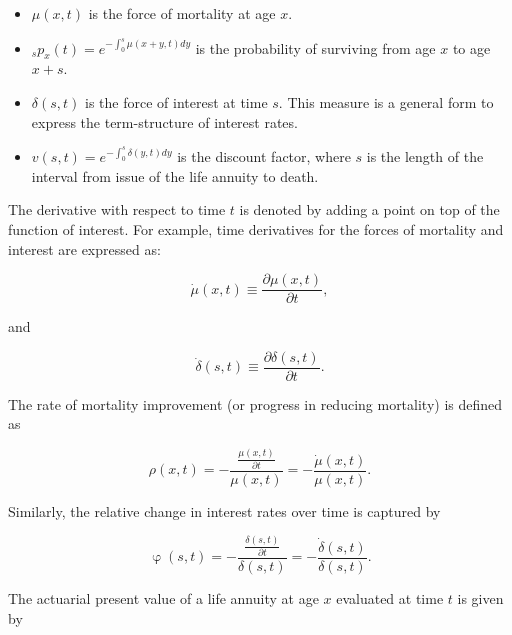 \documentclass[12pt]{article}
\begin{document}
\begin{itemize}

\item
\(\mu(x,t)\) is the force of mortality at age \(x\).

\item
$_sp_x(t)=e^{-\int_{0}^{s}\mu(x+y,t)dy}$ is the probability of surviving from age \(x\) to age \(x+s\).


\item
\(\delta(s,t)\) is the force of interest at time $s$. This measure is a general form to express the term-structure of interest rates.

\item 

${v}(s,t)=e^{-\int_{0}^{s}\delta(y,t)dy}$ is the discount factor, where $s$ is the length of the interval from issue of the life annuity to death.

\end{itemize}

The derivative with respect to time $t$ is denoted by adding a point on top of the function of interest. For example, time derivatives for the forces of mortality and interest are expressed as:

\begin{equation} \label{eq:mudot}
\dot{\mu}(x,t)\equiv\frac{\partial\mu(x,t)}{\partial t},
\end{equation}

and 

\begin{equation} \label{eq:mudot}
\dot{\delta}(s,t)\equiv\frac{\partial\delta(s,t)}{\partial t}.
\end{equation}



The rate of mortality improvement (or progress in reducing mortality) is defined as


\begin{equation} \label{eq:rho}
\rho(x,t)=-\frac{\frac{\mu(x,t)}{\partial t}}{\mu(x,t)} = - \frac{\dot{\mu}(x,t)}{\mu(x,t)}.
\end{equation}

Similarly, the relative change in interest rates over time is captured by 


\begin{equation} \label{eq:phi}
\upvarphi(s,t)=-\frac{\frac{\delta(s,t)}{\partial t}}{\delta(s,t)} = -\frac{\dot{\delta}(s,t)}{\delta(s,t)}.
\end{equation}


The actuarial present value of a life annuity at age $x$ evaluated at time $t$ is given by
\end{document}
